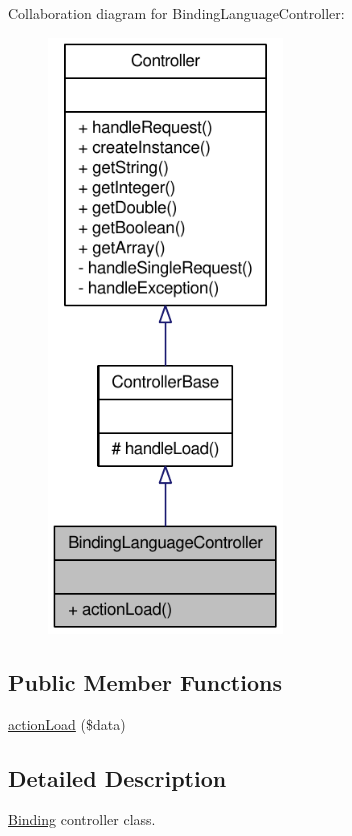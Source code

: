 Collaboration diagram for BindingLanguageController:\nopagebreak
\begin{figure}[H]
\begin{center}
\leavevmode
\includegraphics[width=176pt]{classBindingLanguageController__coll__graph}
\end{center}
\end{figure}
\subsection*{Public Member Functions}
\begin{DoxyCompactItemize}
\item 
\hyperlink{classBindingLanguageController_a564b6c76c76dc61fb02a5a9e25d0e8c7}{actionLoad} (\$data)
\end{DoxyCompactItemize}


\subsection{Detailed Description}
\hyperlink{classBinding}{Binding} controller class. 

